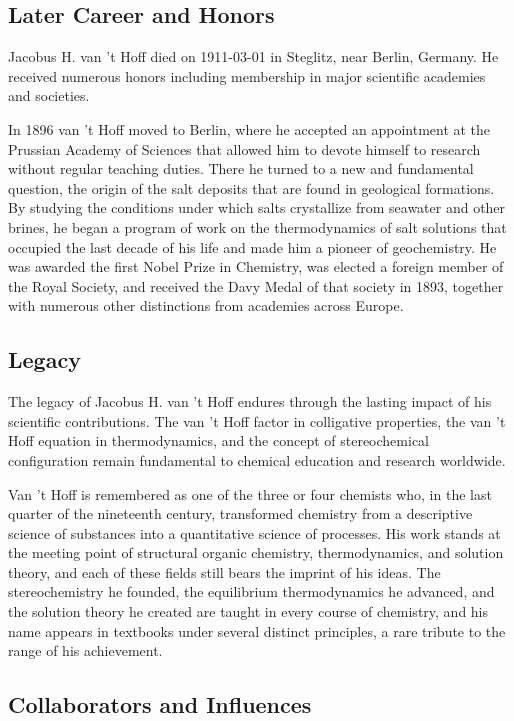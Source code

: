 \subsection*{Later Career and Honors}

Jacobus H. van 't Hoff died on 1911-03-01 in Steglitz, near Berlin, Germany.
He received numerous honors including membership in major scientific academies and societies.

In 1896 van 't Hoff moved to Berlin, where he accepted an appointment at the Prussian Academy of Sciences that allowed him to devote himself to research without regular teaching duties. There he turned to a new and fundamental question, the origin of the salt deposits that are found in geological formations. By studying the conditions under which salts crystallize from seawater and other brines, he began a program of work on the thermodynamics of salt solutions that occupied the last decade of his life and made him a pioneer of geochemistry. He was awarded the first Nobel Prize in Chemistry, was elected a foreign member of the Royal Society, and received the Davy Medal of that society in 1893, together with numerous other distinctions from academies across Europe.

\subsection*{Legacy}

The legacy of Jacobus H. van 't Hoff endures through the lasting impact of his scientific contributions.
The van 't Hoff factor in colligative properties, the van 't Hoff equation in thermodynamics, and the concept of stereochemical configuration remain fundamental to chemical education and research worldwide.

Van 't Hoff is remembered as one of the three or four chemists who, in the last quarter of the nineteenth century, transformed chemistry from a descriptive science of substances into a quantitative science of processes. His work stands at the meeting point of structural organic chemistry, thermodynamics, and solution theory, and each of these fields still bears the imprint of his ideas. The stereochemistry he founded, the equilibrium thermodynamics he advanced, and the solution theory he created are taught in every course of chemistry, and his name appears in textbooks under several distinct principles, a rare tribute to the range of his achievement.

\subsection*{Collaborators and Influences}


